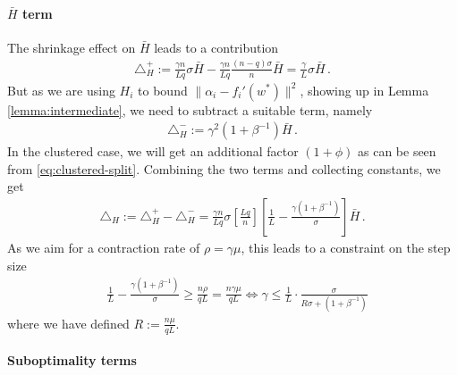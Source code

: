 \documentclass{article}
\begin{document}
\paragraph{$\bar H$ term}  The shrinkage effect on $\bar H$ leads to a contribution 
\begin{align}
\triangle^+_H := \frac{\gamma n}{Lq} \sigma  \bar H - \frac{\gamma n}{Lq} \frac{(n-q)\sigma}{n}   \bar H 
= \frac{\gamma}{L} \sigma  \bar H \,.
\end{align}
But as we are using $H_i$ to bound $\| \alpha_i - f_i'(w^*) \|^2$, showing up in Lemma \ref{lemma:intermediate}, we need to subtract a suitable term, namely
\begin{align}
\triangle^-_H :=   \gamma^2  (1 + \beta^{-1}) \bar H  \,.
\end{align}
In the clustered case, we will get an additional factor $(1+\phi)$ as can be seen from \eqref{eq:clustered-split}.  Combining the two terms and collecting constants, we get 
\begin{align}
\triangle_H := \triangle_H^+ - \triangle_H^- = \frac{\gamma n}{Lq} \sigma 
\left[ \frac {Lq}{n} \right] \left[  \frac 1L - \frac{\gamma \left(1 + \beta^{-1} \right)}{\sigma} \right] \bar H  \,.
\end{align}
%
As we aim for a contraction rate of $\rho = \gamma \mu$, this leads to  a constraint on the step size
\begin{align}
& \frac 1 L  - \frac{\gamma \left(1 + \beta^{-1} \right)}{\sigma} \ge  \frac {n \rho} {qL} =  \frac{n \gamma \mu}{qL}
\iff  \gamma \le \frac 1L \cdot \frac{\sigma}{R\sigma + \left(1+\beta^{-1}\right)} 
\label{eq:step-bound-from-h}
\end{align}
where we have defined $R:= \frac{n \mu}{qL}$. 

\paragraph{Suboptimality terms}
\end{document}
